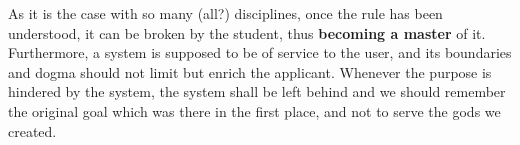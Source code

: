 As it is the case with so many (all?) disciplines, once the rule has been understood, it can be broken by the student, thus \textbf{becoming a master} of it.
Furthermore, a system is supposed to be of service to the user, and its boundaries and dogma should not limit but enrich the applicant.
Whenever the purpose is hindered by the system, the system shall be left behind and we should remember the original goal which was there in the first place, and not to serve the gods we created.
